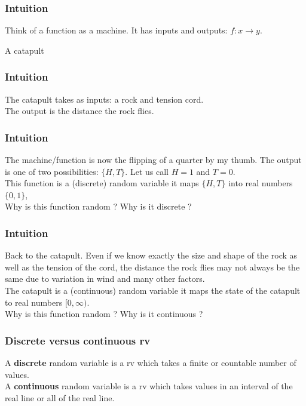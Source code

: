 \begin{frame}[fragile]\frametitle{Intuition}

Think of a function as a machine. It has inputs and outputs:
$f:x \rightarrow y$. 

A catapult

\end{frame}


\begin{frame}[fragile]\frametitle{Intuition}

The catapult takes as inputs: a rock and tension cord. \\
The output is the distance the rock flies.

\end{frame}


\begin{frame}[fragile]\frametitle{Intuition}

The machine/function is now the flipping of a quarter by 
my thumb. The output is one of two possibilities: $\{H,T\}$.
Let us call $H=1$ and $T=0$. \\  

This function is a (discrete) random variable it maps $\{H,T\}$ into
real numbers $\{0,1\}$, \\ 
Why is this function random ? 
Why is it discrete ?


\end{frame}




\begin{frame}[fragile]\frametitle{Intuition}

Back to the catapult. Even if we know exactly the size and
shape of the rock as well as the tension of the cord,
the distance the rock flies may not always be the same
due to variation in wind and many other factors. \\ 

The catapult is a (continuous) random variable it maps 
the state of the catapult to real numbers $[0,\infty)$. \\ 
Why is this function random ? 
Why is it continuous ?


\end{frame}



\begin{frame}[fragile]\frametitle{Discrete versus continuous rv}

\begin{defn}
A {\bf discrete} random variable is a rv  which takes a finite or
countable number of values. \\
A {\bf continuous} random variable is a rv  which takes values in an
interval of the real line or all of the real line.
\end{defn}

\end{frame}


